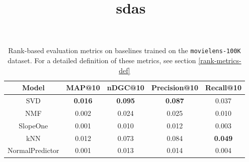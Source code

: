 \documentclass{article}
\begin{document}
\begin{table}[H]
    \centering
        \begin{tabular}{|c c c c c|} 
         \hline
         Model & MAP@10 & nDGC@10 & Precision@10 & Recall@10 \\ [0.5ex] 
         \hline\hline
         SVD & \bfseries 0.016 & \bfseries 0.095 & \bfseries 0.087 & 0.037 \\
         \hline
         NMF & 0.002 & 0.024 & 0.025 & 0.010 \\ 
         \hline
         SlopeOne & 0.001 & 0.010 & 0.012 & 0.003 \\ 
         \hline
         kNN & 0.012 & 0.073 & 0.084 & \bfseries 0.049 \\ 
         \hline 
         NormalPredictor & 0.001 & 0.013 & 0.014 & 0.004 \\[1ex] 
         \hline
        \end{tabular}
    \title{sdas}
    \caption{Rank-based evaluation metrics on baselines trained on the \texttt{movielens-100K} dataset. For a detailed definition of these metrics, see section \ref{rank-metrics-def}}
    \label{tab:baseline-ranking-metrics}
\end{table}

\end{document}
